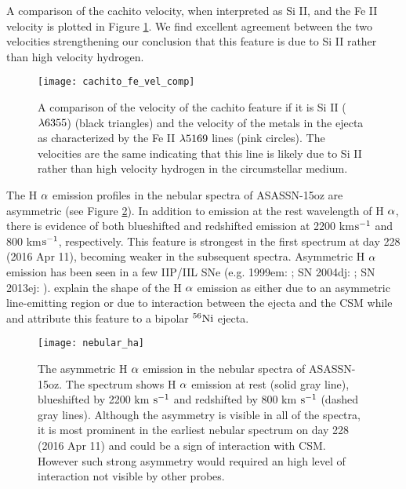 \documentclass[a4paper,fleqn,usenatbib]{mnras}
\begin{document}
A comparison of the cachito velocity, when interpreted as Si II, and the Fe II velocity is plotted in Figure \ref{fig:SiVelocity}.
We find excellent agreement between the two velocities strengthening our conclusion that this feature is due to Si II rather than high velocity hydrogen.
\begin{figure}
\begin{center}
\texttt{[image: cachito\_fe\_vel\_comp]}
\caption{A comparison of the velocity of the cachito feature if it is Si II ($\rm{\lambda6355}$) (black triangles) and the velocity of the metals in the ejecta as characterized by the Fe II $\rm{\lambda5169}$ lines (pink circles).
The velocities are the same indicating that this line is likely due to Si II rather than high velocity hydrogen in the circumstellar medium.}
\label{fig:SiVelocity}
\end{center}
\end{figure}

The H $\rm{\alpha}$ emission profiles in the nebular spectra of ASASSN-15oz are asymmetric (see Figure \ref{fig:nebHa}).
In addition to emission at the rest wavelength of H $\rm{\alpha}$, there is evidence of both blueshifted and redshifted emission at 2200 km$\rm{s^{-1}}$ and 800 km$\rm{s^{-1}}$, respectively. 
This feature is strongest in the first spectrum at day 228 (2016 Apr 11), becoming weaker in the subsequent spectra.
Asymmetric H $\rm{\alpha}$ emission has been seen in a few IIP/IIL SNe (e.g. 1999em: \citealt{2001leonard}; SN 2004dj: \citealt{2005chugai}; SN 2013ej: \citealt{2017utrobin}).
\citet{2001leonard} explain the shape of the H $\rm{\alpha}$ emission as either due to an asymmetric line-emitting region or due to interaction between the ejecta and the CSM while \citet{2005chugai} and \citet{2017utrobin} attribute this feature to a bipolar $\rm{^{56}Ni}$ ejecta. 

\begin{figure}
\begin{center}
\texttt{[image: nebular\_ha]} %
\caption{The asymmetric H $\rm{\alpha}$ emission in the nebular spectra of ASASSN-15oz. 
The spectrum shows H $\rm{\alpha}$ emission at rest (solid gray line), blueshifted by 2200 km $\rm{s^{-1}}$ and redshifted by 800 km $\rm{s^{-1}}$ (dashed gray lines).
Although the asymmetry is visible in all of the spectra, it is most prominent in the earliest nebular spectrum on day 228 (2016 Apr 11) and could be a sign of interaction with CSM.
However such strong asymmetry would required an high level of interaction not visible by other probes.
}
\label{fig:nebHa}
\end{center}
\end{figure}
\end{document}
